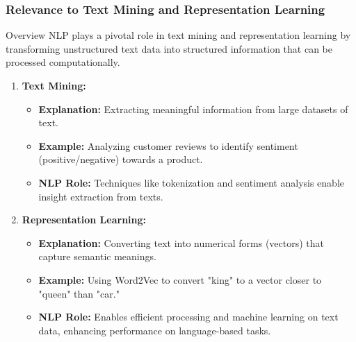 \documentclass[aspectratio=169]{beamer}
\begin{document}
\begin{frame}[fragile]
    \frametitle{Relevance to Text Mining and Representation Learning}
    \begin{block}{Overview}
        NLP plays a pivotal role in text mining and representation learning by transforming unstructured text data into structured information that can be processed computationally.
    \end{block}

    \begin{enumerate}
        \item \textbf{Text Mining:}
            \begin{itemize}
                \item \textbf{Explanation:} Extracting meaningful information from large datasets of text.
                \item \textbf{Example:} Analyzing customer reviews to identify sentiment (positive/negative) towards a product.
                \item \textbf{NLP Role:} Techniques like tokenization and sentiment analysis enable insight extraction from texts.
            \end{itemize}

        \item \textbf{Representation Learning:}
            \begin{itemize}
                \item \textbf{Explanation:} Converting text into numerical forms (vectors) that capture semantic meanings.
                \item \textbf{Example:} Using Word2Vec to convert "king" to a vector closer to "queen" than "car."
                \item \textbf{NLP Role:} Enables efficient processing and machine learning on text data, enhancing performance on language-based tasks.
            \end{itemize}
    \end{enumerate}
\end{frame}
\end{document}

